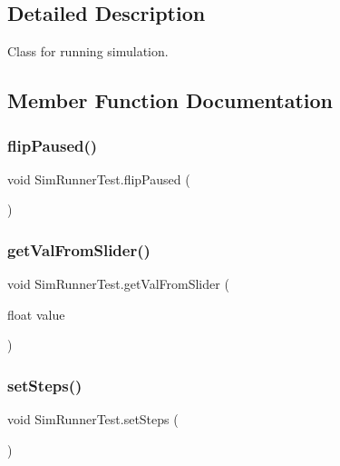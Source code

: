 \subsection{Detailed Description}
Class for running simulation. 



\subsection{Member Function Documentation}
\mbox{\label{class_sim_runner_test_a2c0a21b60ed966ab67b2bdf46e4b4b4e}} 
\subsubsection{\texorpdfstring{flip\+Paused()}{flipPaused()}}
{\footnotesize\ttfamily void Sim\+Runner\+Test.\+flip\+Paused (\begin{DoxyParamCaption}{ }\end{DoxyParamCaption})}

\mbox{\label{class_sim_runner_test_a7919c296008d4ed412b1b6c1469753ef}} 
\subsubsection{\texorpdfstring{get\+Val\+From\+Slider()}{getValFromSlider()}}
{\footnotesize\ttfamily void Sim\+Runner\+Test.\+get\+Val\+From\+Slider (\begin{DoxyParamCaption}\item[{float}]{value }\end{DoxyParamCaption})}

\mbox{\label{class_sim_runner_test_ae48ceacccbc52ef5a7f037f0a723a781}} 
\subsubsection{\texorpdfstring{set\+Steps()}{setSteps()}}
{\footnotesize\ttfamily void Sim\+Runner\+Test.\+set\+Steps (\begin{DoxyParamCaption}{ }\end{DoxyParamCaption})}



